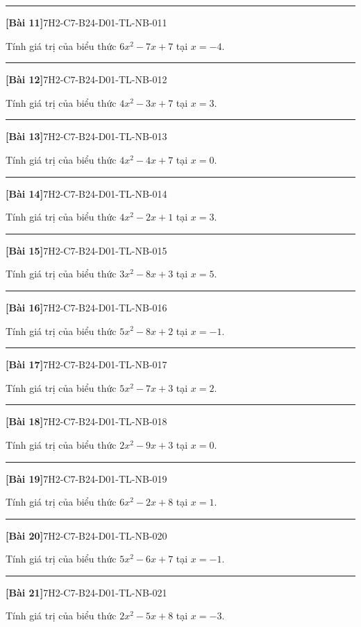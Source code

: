 \documentclass[12pt,a4paper]{article}
\newif\ifloigiai
\newenvironment{cauhoi}[2]{%
  \par\medskip\noindent\rule{\textwidth}{0.4pt}\par\nopagebreak
  \noindent\textbf{[#1]}\hfill{\scriptsize\ttfamily #2}\par\nopagebreak\smallskip}{\par}
\newcommand{\loigiai}[1]{\ifloigiai\par\smallskip\noindent\textit{Lời giải.} #1\par\fi}
\begin{document}
\begin{cauhoi}{Bài 11}{7H2-C7-B24-D01-TL-NB-011}
Tính giá trị của biểu thức $6x^{2}-7x+7$ tại $x=-4$.
\loigiai{Thay $x=-4$: $6\cdot(-4)^{2}-7\cdot(-4)+7=131$.}
\end{cauhoi}
\begin{cauhoi}{Bài 12}{7H2-C7-B24-D01-TL-NB-012}
Tính giá trị của biểu thức $4x^{2}-3x+7$ tại $x=3$.
\loigiai{Thay $x=3$: $4\cdot(3)^{2}-3\cdot(3)+7=34$.}
\end{cauhoi}
\begin{cauhoi}{Bài 13}{7H2-C7-B24-D01-TL-NB-013}
Tính giá trị của biểu thức $4x^{2}-4x+7$ tại $x=0$.
\loigiai{Thay $x=0$: $4\cdot(0)^{2}-4\cdot(0)+7=7$.}
\end{cauhoi}
\begin{cauhoi}{Bài 14}{7H2-C7-B24-D01-TL-NB-014}
Tính giá trị của biểu thức $4x^{2}-2x+1$ tại $x=3$.
\loigiai{Thay $x=3$: $4\cdot(3)^{2}-2\cdot(3)+1=31$.}
\end{cauhoi}
\begin{cauhoi}{Bài 15}{7H2-C7-B24-D01-TL-NB-015}
Tính giá trị của biểu thức $3x^{2}-8x+3$ tại $x=5$.
\loigiai{Thay $x=5$: $3\cdot(5)^{2}-8\cdot(5)+3=38$.}
\end{cauhoi}
\begin{cauhoi}{Bài 16}{7H2-C7-B24-D01-TL-NB-016}
Tính giá trị của biểu thức $5x^{2}-8x+2$ tại $x=-1$.
\loigiai{Thay $x=-1$: $5\cdot(-1)^{2}-8\cdot(-1)+2=15$.}
\end{cauhoi}
\begin{cauhoi}{Bài 17}{7H2-C7-B24-D01-TL-NB-017}
Tính giá trị của biểu thức $5x^{2}-7x+3$ tại $x=2$.
\loigiai{Thay $x=2$: $5\cdot(2)^{2}-7\cdot(2)+3=9$.}
\end{cauhoi}
\begin{cauhoi}{Bài 18}{7H2-C7-B24-D01-TL-NB-018}
Tính giá trị của biểu thức $2x^{2}-9x+3$ tại $x=0$.
\loigiai{Thay $x=0$: $2\cdot(0)^{2}-9\cdot(0)+3=3$.}
\end{cauhoi}
\begin{cauhoi}{Bài 19}{7H2-C7-B24-D01-TL-NB-019}
Tính giá trị của biểu thức $6x^{2}-2x+8$ tại $x=1$.
\loigiai{Thay $x=1$: $6\cdot(1)^{2}-2\cdot(1)+8=12$.}
\end{cauhoi}
\begin{cauhoi}{Bài 20}{7H2-C7-B24-D01-TL-NB-020}
Tính giá trị của biểu thức $5x^{2}-6x+7$ tại $x=-1$.
\loigiai{Thay $x=-1$: $5\cdot(-1)^{2}-6\cdot(-1)+7=18$.}
\end{cauhoi}
\begin{cauhoi}{Bài 21}{7H2-C7-B24-D01-TL-NB-021}
Tính giá trị của biểu thức $2x^{2}-5x+8$ tại $x=-3$.
\loigiai{Thay $x=-3$: $2\cdot(-3)^{2}-5\cdot(-3)+8=41$.}
\end{cauhoi}
\end{document}
